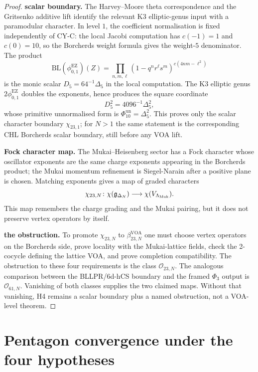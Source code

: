 \begin{proof}
\textbf{scalar boundary.} The Harvey--Moore theta
correspondence and the Gritsenko additive lift identify the relevant
K3 elliptic-genus input with a paramodular character. In level \(1\),
the coefficient normalisation is fixed independently of CY-C: the local
Jacobi computation has \(c(-1)=1\) and \(c(0)=10\), so the Borcherds
weight formula gives the weight-\(5\) denominator. The product
\[
 \mathrm{BL}(\phi_{0,1}^{\mathrm{EZ}})(Z)
 =
 \prod_{n,m,\ell}
 (1-q^n r^\ell s^m)^{c(4nm-\ell^2)}
\]
is the monic scalar \(D_5=64^{-1}\Delta_5\) in the local computation.
The K3 elliptic genus \(2\phi_{0,1}^{\mathrm{EZ}}\) doubles the
exponents, hence produces the square coordinate
\[
 D_5^2=4096^{-1}\Delta_5^2,
\]
whose primitive unnormalised form is \(\Phi_{10}^{\mathrm{un}}=\Delta_5^2\).
This proves only the scalar character boundary \(\chi_{23,1}\); for
\(N>1\) the same statement is the corresponding CHL Borcherds scalar
boundary, still before any VOA lift.

\textbf{Fock character map.} The Mukai--Heisenberg sector has a Fock
character whose oscillator exponents are the same charge exponents
appearing in the Borcherds product; the Mukai momentum refinement is
Siegel-Narain after a positive plane is chosen. Matching exponents gives a map of graded
characters
\[
 \chi_{23,N}\colon \chi(\mathfrak g_{\Delta_N})\longrightarrow
 \chi(V_{\Lambda_{\mathrm{Muk}}}).
\]
This map remembers the charge grading and the Mukai pairing, but it
does not preserve vertex operators by itself.

\textbf{the obstruction.} To promote \(\chi_{23,N}\) to
\(\beta_{23,N}^{\mathrm{VOA}}\) one must choose vertex operators on the
Borcherds side, prove locality with the Mukai-lattice fields, check the
2-cocycle defining the lattice VOA, and prove completion compatibility.
The obstruction to these four requirements is the class
\(\mathcal O_{23,N}\). The analogous comparison between the BLLPR/6d-hCS
boundary and the framed \(\Phi_3\) output is \(\mathcal O_{61,N}\).
Vanishing of both classes supplies the two claimed maps. Without that
vanishing, H4 remains a scalar boundary plus a named obstruction, not a
VOA-level theorem.
\end{proof}

\section{Pentagon convergence under the four hypotheses}
\label{sec:pentagon-upgrade-provedhere}

